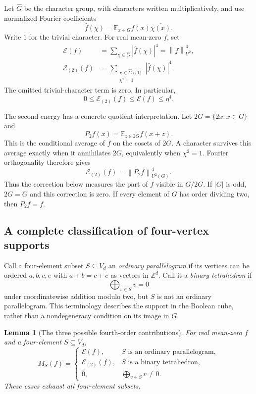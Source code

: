 \documentclass[11pt,letterpaper]{article}
\numberwithin{equation}{section}
\newtheorem{lemma}[theorem]{Lemma}
\theoremstyle{definition}
\theoremstyle{remark}
\newcommand{\E}{\mathbb E}
\newcommand{\Z}{\mathbb Z}
\newcommand{\1}{\mathbf 1}
\newcommand{\norm}[1]{\left\|#1\right\|}
\begin{document}
Let $\widehat G$ be the character group, with characters written
multiplicatively, and use normalized Fourier coefficients
\[
 \widehat f(\chi)=\E_{x\in G}f(x)\overline{\chi(x)}.
\]
Write $1$ for the trivial character.  For real mean-zero $f$, set
\begin{align}
 \mathcal E(f)
   &=\sum_{\chi\in\widehat G}|\widehat f(\chi)|^4
     =\norm{f}_{U^2}^4, \label{gsr:cc:03:cube:energy}\\
 \mathcal E_{(2)}(f)
   &=\sum_{\substack{\chi\in\widehat G\setminus\{1\}\\\chi^2=1}}
                         |\widehat f(\chi)|^4.
 \label{gsr:cc:03:cube:torsionenergy}
\end{align}
The omitted trivial-character term is zero.  In particular,
\begin{equation}
 0\leq\mathcal E_{(2)}(f)\leq\mathcal E(f)\leq\eta^4.
 \label{gsr:cc:03:cube:energybounds}
\end{equation}

The second energy has a concrete quotient interpretation.  Let
$2G=\{2x:x\in G\}$ and
\[
 P_2f(x)=\E_{z\in2G}f(x+z).
\]
This is the conditional average of $f$ on the cosets of $2G$.
A character survives this average exactly when it annihilates $2G$,
equivalently when $\chi^2=1$.  Fourier orthogonality therefore gives
\begin{equation}
 \mathcal E_{(2)}(f)=\norm{P_2f}_{U^2(G)}^4.
 \label{gsr:cc:03:cube:quotient}
\end{equation}
Thus the correction below measures the part of $f$ visible in $G/2G$.
If $|G|$ is odd, $2G=G$ and this correction is zero.  If every element
of $G$ has order dividing two, then $P_2f=f$.

\subsection{A complete classification of four-vertex supports}

Call a four-element subset $S\subseteq V_d$ an \emph{ordinary
parallelogram} if its vertices can be ordered $a,b,c,e$ with
$a+b=c+e$ as vectors in $\Z^d$.  Call it a \emph{binary tetrahedron}
if
\[
 \bigoplus_{v\in S}v=0
\]
under coordinatewise addition modulo two, but $S$ is not an ordinary
parallelogram.  This terminology describes the support in the Boolean
cube, rather than a nondegeneracy condition on its image in $G$.

\begin{lemma}[The three possible fourth-order contributions]
\label{gsr:cc:03:cube:classification}
For real mean-zero $f$ and a four-element $S\subseteq V_d$,
\begin{equation}
 M_S(f)=
 \begin{cases}
  \mathcal E(f),&S\text{ is an ordinary parallelogram},\\
  \mathcal E_{(2)}(f),&S\text{ is a binary tetrahedron},\\
  0,&\displaystyle\bigoplus_{v\in S}v\ne0.
 \end{cases}
 \label{gsr:cc:03:cube:classificationformula}
\end{equation}
These cases exhaust all four-element subsets.
\end{lemma}
\end{document}
